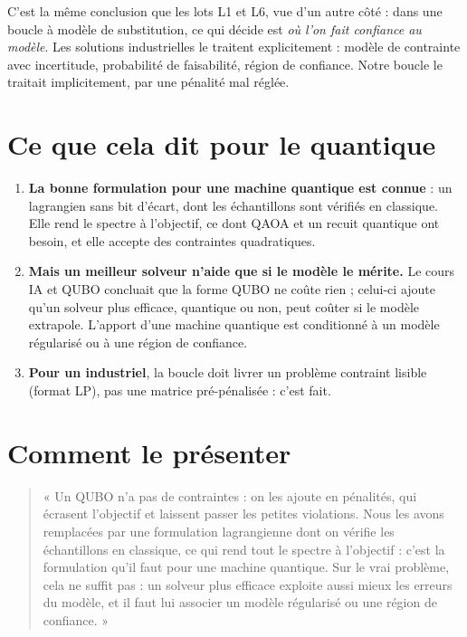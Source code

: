 C'est la même conclusion que les lots L1 et L6, vue d'un autre côté : dans une boucle à modèle de substitution, ce qui décide est \emph{où l'on fait confiance au modèle}. Les solutions industrielles le traitent explicitement : modèle de contrainte avec incertitude, probabilité de faisabilité, région de confiance. Notre boucle le traitait implicitement, par une pénalité mal réglée.

\section{Ce que cela dit pour le quantique}
\begin{enumerate}
\item \textbf{La bonne formulation pour une machine quantique est connue} : un lagrangien sans bit d'écart, dont les échantillons sont vérifiés en classique. Elle rend le spectre à l'objectif, ce dont QAOA et un recuit quantique ont besoin, et elle accepte des contraintes quadratiques.
\item \textbf{Mais un meilleur solveur n'aide que si le modèle le mérite.} Le cours IA et QUBO concluait que la forme QUBO ne coûte rien ; celui-ci ajoute qu'un solveur plus efficace, quantique ou non, peut coûter si le modèle extrapole. L'apport d'une machine quantique est conditionné à un modèle régularisé ou à une région de confiance.
\item \textbf{Pour un industriel}, la boucle doit livrer un problème contraint lisible (format LP), pas une matrice pré-pénalisée : c'est fait.
\end{enumerate}

\section{Comment le présenter}
\begin{quote}
« Un QUBO n'a pas de contraintes : on les ajoute en pénalités, qui écrasent l'objectif et laissent passer les petites violations. Nous les avons remplacées par une formulation lagrangienne dont on vérifie les échantillons en classique, ce qui rend tout le spectre à l'objectif : c'est la formulation qu'il faut pour une machine quantique. Sur le vrai problème, cela ne suffit pas : un solveur plus efficace exploite aussi mieux les erreurs du modèle, et il faut lui associer un modèle régularisé ou une région de confiance. »
\end{quote}

